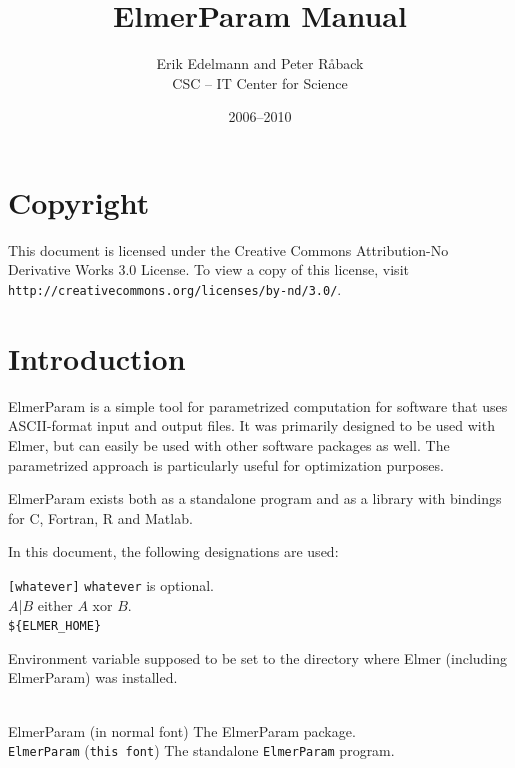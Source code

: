 \documentclass[12pt,a4paper]{article}
\newcommand{\code}[1]{\texttt{#1}}
\begin{document}
\title{ElmerParam Manual}
\author{Erik Edelmann and Peter R{\aa}back \\ CSC -- IT Center for Science}
\date{2006--2010}
\maketitle

\section*{Copyright}

This document is licensed under the Creative Commons Attribution-No Derivative Works 3.0 License. 
To view a copy of this license, visit \\
\texttt{http://creativecommons.org/licenses/by-nd/3.0/}.


\section{Introduction}

ElmerParam is a simple tool for parametrized computation for software
that uses ASCII-format input and output files. It was primarily designed to
be used with Elmer, but can easily be used with other software packages as
well.  The parametrized approach is particularly useful for optimization
purposes.

ElmerParam exists both as a standalone program and as a library with
bindings for C, Fortran, R and Matlab.

In this document, the following designations are used:
\begin{tabbing}
    \code{[whatever]} \hspace{2em} \= \code{whatever} is optional.\\
    $A$|$B$              \> either $A$ xor $B$.\\
    \code{\$\{ELMER\_HOME\}} \> \parbox[t]{0.70\textwidth}{Environment
                            variable supposed to be set to the directory
                            where Elmer (including ElmerParam) was
                            installed.}\\
    ElmerParam  \> (in normal font) The ElmerParam package.\\
    \code{ElmerParam} \>  (\code{this font}) The standalone
                          \texttt{ElmerParam} program.

\end{tabbing}
\end{document}
